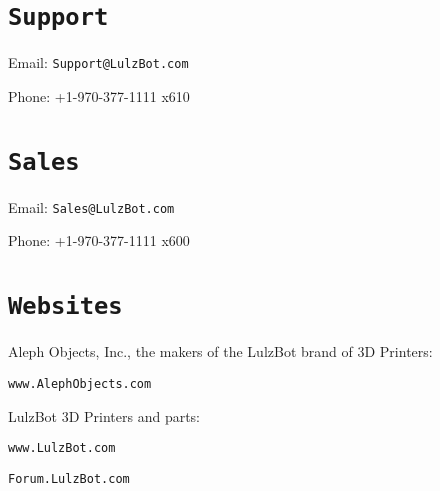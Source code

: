 %
%
%
%
%

\section{\texttt{Support}}
\setlength{\parindent}{0pt}
Email: \texttt{Support@LulzBot.com}

Phone: +1-970-377-1111 x610

\section{\texttt{Sales}}

Email: \texttt{Sales@LulzBot.com}

Phone: +1-970-377-1111 x600

\section{\texttt{Websites}}

Aleph Objects, Inc.\textsuperscript{\miniscule{\textregistered}}, the makers of the LulzBot\textsuperscript{\miniscule{\textregistered}} brand of 3D Printers:

\texttt{www.AlephObjects.com}


LulzBot 3D Printers and parts:

\texttt{www.LulzBot.com}

\texttt{Forum.LulzBot.com}
